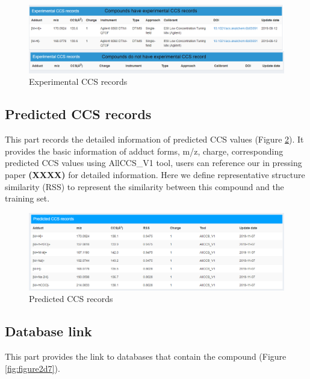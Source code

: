 \documentclass[12pt,]{book}
\begin{document}
\begin{figure}

{\centering \includegraphics{images/chapter2/figure2.5compound_card_exp_ccs} 

}

\caption{Experimental CCS records}\label{fig:figure2d5}
\end{figure}

\subsection{Predicted CCS records}\label{chapter2d2d4}

This part records the detailed information of predicted CCS values
(Figure \ref{fig:figure2d6}). It provides the basic information of
adduct forms, m/z, charge, corresponding predicted CCS values using
AllCCS\_V1 tool, users can reference our in pressing paper
\textbf{(XXXX)} for detailed information. Here we define representative
structure similarity (RSS) to represent the similarity between this
compound and the training set.

\begin{figure}

{\centering \includegraphics{images/chapter2/figure2.6predicted_ccs} 

}

\caption{Predicted CCS records}\label{fig:figure2d6}
\end{figure}

\subsection{Database link}\label{chapter2d2d5}

This part provides the link to databases that contain the compound
(Figure \ref{fig:figure2d7}).
\end{document}
